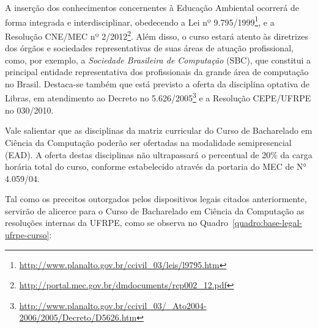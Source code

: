 \documentclass[
	12pt,				%
	openright,			%
  oneside,     %
	a4paper,			%
	english,			%
	french,				%
	spanish,			%
	brazil				%
	]{abntex2}
\begin{document}
A inserção dos conhecimentos concernentes à Educação Ambiental ocorrerá de forma integrada e interdisciplinar, obedecendo a Lei nº 9.795/1999\footnote{\url{http://www.planalto.gov.br/ccivil_03/leis/l9795.htm}}, e a Resolução CNE/MEC nº 2/2012\footnote{\url{http://portal.mec.gov.br/dmdocuments/rcp002_12.pdf}}. Além disso, o curso estará atento às diretrizes dos órgãos e sociedades representativas de suas áreas de atuação profissional, como, por exemplo, a \textit{Sociedade Brasileira de Computação} (SBC), que constitui a principal entidade representativa dos profissionais da grande área de computação no Brasil. Destaca-se também que está previsto a oferta da disciplina optativa de Libras, em atendimento ao Decreto no 5.626/2005\footnote{\url{http://www.planalto.gov.br/ccivil_03/_Ato2004-2006/2005/Decreto/D5626.htm}} e a Resolução CEPE/UFRPE no 030/2010.

Vale salientar que as disciplinas da matriz curricular do Curso de Bacharelado em Ciência da Computação poderão ser ofertadas na modalidade semipresencial (EAD). A oferta destas disciplinas não ultrapassará o percentual de 20\% da carga horária total do curso, conforme estabelecido através da portaria do MEC de N° 4.059/04.

Tal como os preceitos outorgados pelos dispositivos legais citados anteriormente, servirão de alicerce para o Curso de Bacharelado em Ciência da Computação as resoluções internas da UFRPE, como se observa no Quadro~\ref*{quadro:base-legal-ufrpe-curso}:
\end{document}
